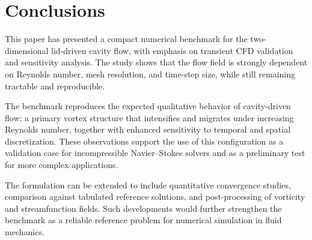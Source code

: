 \documentclass[final,3p,times]{elsarticle}
\begin{document}
\section{Conclusions}

This paper has presented a compact numerical benchmark for the two-dimensional lid-driven cavity flow, with emphasis on transient CFD validation and sensitivity analysis. The study shows that the flow field is strongly dependent on Reynolds number, mesh resolution, and time-step size, while still remaining tractable and reproducible.

The benchmark reproduces the expected qualitative behavior of cavity-driven flow: a primary vortex structure that intensifies and migrates under increasing Reynolds number, together with enhanced sensitivity to temporal and spatial discretization. These observations support the use of this configuration as a validation case for incompressible Navier--Stokes solvers and as a preliminary test for more complex applications.

The formulation can be extended to include quantitative convergence studies, comparison against tabulated reference solutions, and post-processing of vorticity and streamfunction fields. Such developments would further strengthen the benchmark as a reliable reference problem for numerical simulation in fluid mechanics.
\end{document}
